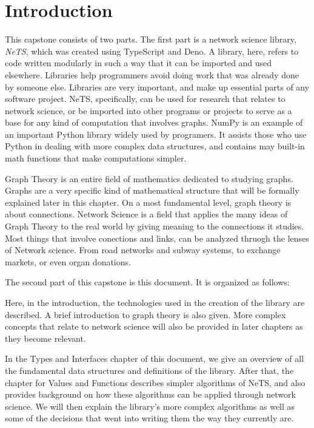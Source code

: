 \chapter{Introduction}

This capstone consists of two parts.
The first part is a network science library, \textit{NeTS},
which was created using TypeScript and Deno.
A library, here, refers to code written modularly in such a way that it can be imported and used elsewhere.
Libraries help programmers avoid doing work that was already done by someone else.
Libraries are very important, and make up essential parts of any software project.
NeTS, specifically, can be used for research that relates to network science,
or be imported into other programs or projects to serve as a base for any
kind of computation that involves graphs.
NumPy is an example of an important Python library widely used by programers.
It assists those who use Python in dealing with more complex data structures,
and contains may built-in math functions that make computations simpler.

Graph Theory is an entire field of mathematics dedicated to studying graphs.
Graphs are a very specific kind of mathematical structure
that will be formally explained later in this chapter.
On a most fundamental level, graph theory is about connections.
Network Science is a field that applies the many ideas of Graph Theory to the real world
by giving meaning to the connections it studies.
Most things that involve conections and links,
can be analyzed thruogh the lenses of Network science.
From road networks and subway systems, to exchange markets, or even organ donations.

The second part of this capstone is this document. It is organized as follows:

Here, in the introduction, the technologies used in the creation of the library are described.
A brief introduction to graph theory is also given.
More complex concepts that relate to network science will also be
provided in later chapters as they become relevant.

In the Types and Interfaces chapter of this document, we give an overview of all the fundamental
data structures and definitions of the library.
After that, the chapter for Values and Functions describes simpler algorithms
of NeTS, and also provides background on how these algorithms can be applied through network science.
We will then explain the library's more complex algorithms as well as some of the
decisions that went into writing them the way they currently are.

